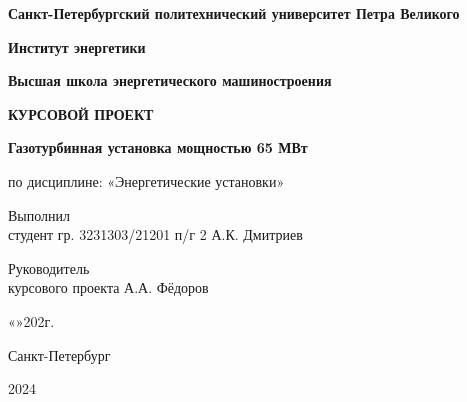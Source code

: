 \begin{titlepage}
  \begin{center}
    \textbf{Санкт-Петербургский политехнический университет Петра Великого}

    \textbf{Институт энергетики}

    \textbf{Высшая школа энергетического машиностроения}
  \end{center}

  \vspace{3cm}

  \begin{center}
    \begin{large}
      \textbf{КУРСОВОЙ ПРОЕКТ}
    \end{large}

    \vspace{1cm}
    \textbf{Газотурбинная установка мощностью 65 МВт}

    по дисциплине: «Энергетические установки»
  \end{center}

  \vspace{3cm}

  \begin{flushleft}
    Выполнил\\ студент гр. 3231303/21201 п/г 2 \hspace{1cm} \hrulefill \hspace{1cm} А.К. Дмитриев

    \vspace{0.5cm}

    Руководитель\\ курсового проекта \hspace{3.5cm} \hrulefill \hspace{1cm} А.А. Фёдоров
  \end{flushleft}

  \begin{flushright}
    «\underline{\hspace{0.5cm}}»\underline{\hspace{3cm}}202\underline{\hspace{0.5cm}}г.
  \end{flushright}


  \vfill
  \begin{center}
    Санкт-Петербург

    2024
  \end{center}
\end{titlepage}
